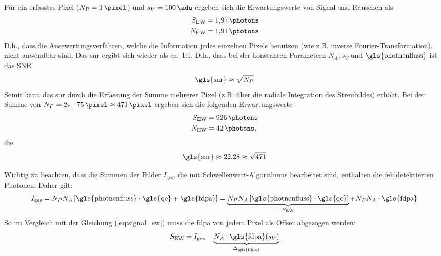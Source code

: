 \noindent
Für ein erfasstes Pixel ($N_P = \SI{1}{\pixel}$) und $s_V = \SI{100}{\adu}$ ergeben sich die Erwartungswerte von Signal und Rauschen als
\begin{equation}
    \begin{split}
        S_\text{EW} &= \SI{1.97}{\photons}\\
        N_\text{EW} &= \SI{1.91}{\photons}\\
    \end{split}
\end{equation}
\noindent
D.h., dass die Ausewertungsverfahren, welche die Information jedes einzelnen Pixels benutzen (wie z.B. inverse Fourier-Transformation), nicht anwendbar sind. Das \gls{snr} ergibt sich wieder als ca. 1:1. D.h., dass bei der konstanten Parametern $N_A, s_V$ und $\text{\gls{photnenfluss}}$ ist das SNR
\begin{equation}
    \text{\gls{snr}} \approx \sqrt{N_P}
\end{equation}
\noindent
Somit kann das \gls{snr} durch die Erfassung der Summe mehrerer Pixel (z.B. über die radiale Integration des Streubildes) erhöht. Bei der Summe von $N_P = 2\pi\cdot\SI{75}{\pixel} \approx \SI{471}{\pixel}$ ergeben sich die folgenden Erwartungswerte
\begin{equation}
    \begin{split}
        S_\text{EW} &= \SI{926}{\photons}\\
        N_\text{EW} &= \SI{42}{\photons},
    \end{split}
\end{equation}
die 
\begin{equation}
    \text{\gls{snr}} \approx \num{22.28} \approx \sqrt{471}
\end{equation}

\noindent
Wichtig zu beachten, dass die Summen der Bilder $I_\text{ges}$, die  mit Schwellenwert-Algorithmus bearbeitet sind, enthalten die fehldetektierten Photonen. Daher gilt:
\begin{equation}
    I_\text{ges} = N_P N_A \left[\text{\gls{photnenfluss}}\cdot \text{\gls{qe}} + \text{\gls{fdpa}}\right] = \underbrace{N_P N_A \left[\text{\gls{photnenfluss}}\cdot \text{\gls{qe}}\right]}_{S_\text{EW}} + N_P N_A\cdot\text{\gls{fdpa}}
\end{equation}
So im Vergleich mit der Gleichung (\ref{eq:signal_ew}) muss die \gls{fdpa} von jedem Pixel als Offset abgezogen werden:
\begin{equation}
    S_\text{EW} = I_\text{ges} - \underbrace{N_A\cdot\text{\gls{fdpa}}(s_V)}_{\Delta_\text{\gls{fdpa}}}
    \label{eq:signal_int_fpda}
\end{equation}

